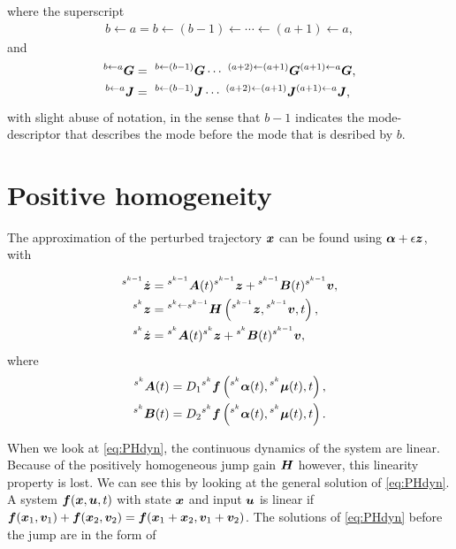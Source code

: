\documentclass[../DC2019003Bouma.tex]{subfiles}
\begin{document}
where the superscript
\begin{align}
b\leftarrow a =b\leftarrow (b-1) \leftarrow \cdots \leftarrow (a+1) \leftarrow a,
\end{align}
and
\begin{align}
^{b\leftarrow a}\Gb &=\ ^{b\leftarrow (b-1)}\Gb\cdots\ ^{(a+2)\leftarrow (a+1)}\Gb^{(a+1)\leftarrow a}\Gb,\\
^{b\leftarrow a}\Jb &=\ ^{b\leftarrow (b-1)}\Jb\cdots\ ^{(a+2)\leftarrow (a+1)}\Jb^{(a+1)\leftarrow a}\Jb,
\end{align}
with slight abuse of notation, in the sense that $b-1$ indicates the mode-descriptor that describes the mode before the mode that is desribed by $b$.

\section{Positive homogeneity}\label{app:poshom}
The approximation of the perturbed trajectory ${\boldsymbol{x}}$ can be found using $\boldsymbol{\alpha} + \epsilon{\boldsymbol{z}}$, with

\begin{align}
\hspace{0cm}^{s^{k-1}}\dot{{\boldsymbol{z}}} &=\hspace{0cm}^{s^{k-1}}{\boldsymbol{A}}(t)\hspace{0cm}^{s^{k-1}}{\boldsymbol{z}} +\hspace{0cm}^{s^{k-1}}{\boldsymbol{B}}(t)\hspace{0cm}^{s^{k-1}}{\boldsymbol{v}},\nonumber\\
\hspace{0cm}^{s^{k}}{\boldsymbol{z}} &= \hspace{0cm}^{s^{k}\leftarrow s^{k-1}}{\boldsymbol{H}}\left(\hspace{0cm}^{s^{k-1}}{\boldsymbol{z}},\hspace{0cm}^{s^{k-1}}{\boldsymbol{v}},t\right),\label{eq:PHdyn}\\
\hspace{0cm}^{s^{k}}\dot{{\boldsymbol{z}}} &=\hspace{0cm}^{s^{k}}{\boldsymbol{A}}(t)\hspace{0cm}^{s^{k}}{\boldsymbol{z}} +\hspace{0cm}^{s^{k}}{\boldsymbol{B}}(t)\hspace{0cm}^{s^{k-1}}{\boldsymbol{v}},\nonumber
\end{align}
where
\begin{align}
^{s^{k}}{\boldsymbol{A}}(t) &= D_1\hspace{0cm}^{s^{k}}{\boldsymbol{f}}\left(\hspace{0cm}^{s^{k}}\boldsymbol{\alpha}(t),\hspace{0cm}^{s^{k}}\boldsymbol{\mu}(t),t\right),\\
^{s^{k}}{\boldsymbol{B}}(t) &= D_2\hspace{0cm}^{s^{k}}{\boldsymbol{f}}\left(\hspace{0cm}^{s^{k}}\boldsymbol{\alpha}(t),\hspace{0cm}^{s^{k}}\boldsymbol{\mu}(t),t\right).
\end{align}

When we look at \eqref{eq:PHdyn}, the continuous dynamics of the system are linear. Because of the positively homogeneous jump gain ${\boldsymbol{H}}$ however, this linearity property is lost. We can see this by looking at the general solution of \eqref{eq:PHdyn}. A system ${\boldsymbol{f}}({\boldsymbol{x}},{\boldsymbol{u}},t)$ with state ${\boldsymbol{x}}$ and input ${\boldsymbol{u}}$ is linear if ${\boldsymbol{f}}({\boldsymbol{x}}_1,{\boldsymbol{v}}_1) + {\boldsymbol{f}}({\boldsymbol{x}}_2,{\boldsymbol{v}}_2) = {\boldsymbol{f}}({\boldsymbol{x}}_1+{\boldsymbol{x}}_2,{\boldsymbol{v}}_1+{\boldsymbol{v}}_2)$. The solutions of \eqref{eq:PHdyn} before the jump are in the form of
\end{document}
